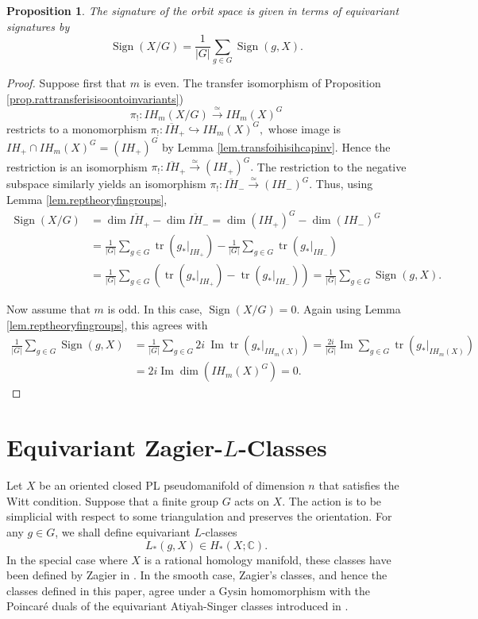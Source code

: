 \documentclass{amsart}
\newtheorem{prop}[thm]{Proposition}
\theoremstyle{definition}
\theoremstyle{remark}
\newcommand {\cplx}  {\ensuremath{\mathbb{C}}}
\newcommand {\Sign}    {{\ensuremath{\operatorname{Sign}}}}
\newcommand {\tr}    {{\ensuremath{\operatorname{tr}}}}
\begin{document}
\begin{prop} \label{prop.signatureoforbitspace}
The signature of the orbit space is given in terms of equivariant signatures
by
\[ \Sign (X/G) = \frac{1}{|G|} \sum_{g\in G} \Sign (g,X). \]
\end{prop}
\begin{proof}
Suppose first that $m$ is even.
The transfer isomorphism of Proposition \ref{prop.rattransferisisoontoinvariants})
\[ \pi_!: IH_m (X/G) \stackrel{\simeq}{\longrightarrow} IH_m (X)^G  \]
restricts to a monomorphism
$\pi_!: \overline{IH}_+ \hookrightarrow IH_m (X)^G,$
whose image is $IH_+ \cap IH_m (X)^G = (IH_+)^G$ 
by Lemma \ref{lem.transfoihisihcapinv}.
Hence the restriction is an isomorphism
$\pi_!: \overline{IH}_+ \stackrel{\simeq}{\longrightarrow} (IH_+)^G.$
The restriction to the negative subspace similarly yields an isomorphism
$\pi_!: \overline{IH}_- \stackrel{\simeq}{\longrightarrow} (IH_-)^G.$
Thus, using Lemma \ref{lem.reptheoryfingroups},
\begin{align*}
\Sign (X/G)
&= \dim \overline{IH}_+ - \dim \overline{IH}_- 
 = \dim (IH_+)^G - \dim (IH_-)^G \\
&= \frac{1}{|G|} \sum_{g\in G} \tr (g_*|_{IH_+}) - 
       \frac{1}{|G|} \sum_{g\in G} \tr (g_*|_{IH_-}) \\
&= \frac{1}{|G|} \sum_{g\in G} \left( \tr (g_*|_{IH_+}) - 
         \tr (g_*|_{IH_-}) \right) 
 = \frac{1}{|G|} \sum_{g\in G} \Sign(g,X).               
\end{align*}

Now assume that $m$ is odd.
In this case, $\Sign (X/G)=0$. Again using Lemma \ref{lem.reptheoryfingroups},
this agrees with
\begin{align*}
\frac{1}{|G|} \sum_{g\in G} \Sign(g,X)
  &= \frac{1}{|G|} \sum_{g\in G}  
     2i~ \operatorname{Im} \tr(g_*|_{IH_m (X)}) 
   = \frac{2i}{|G|} \operatorname{Im} \sum_{g\in G}  
         \tr(g_*|_{IH_m (X)}) \\
  &= 2i \operatorname{Im} \dim (IH_m (X)^G) 
   = 0.
\end{align*}
\end{proof}






\section{Equivariant Zagier-$L$-Classes}
\label{sec.equivariantzagierlclass}

Let $X$ be an oriented closed PL pseudomanifold of dimension $n$
that satisfies the Witt condition. Suppose that a finite group 
$G$ acts on $X$.
The action is to be simplicial with respect to some triangulation
and preserves the orientation.
For any $g\in G$, we shall define equivariant $L$-classes
\[ L_* (g,X) \in H_* (X; \cplx).\]
In the special case where $X$ is a rational homology manifold, these
classes have been defined by Zagier in \cite{zagier}.
In the smooth case, Zagier's classes, and hence the classes defined in this
paper, agree under a Gysin homomorphism with the Poincar\'e duals of
the equivariant Atiyah-Singer classes introduced in \cite{atiyahsinger}.
\end{document}
